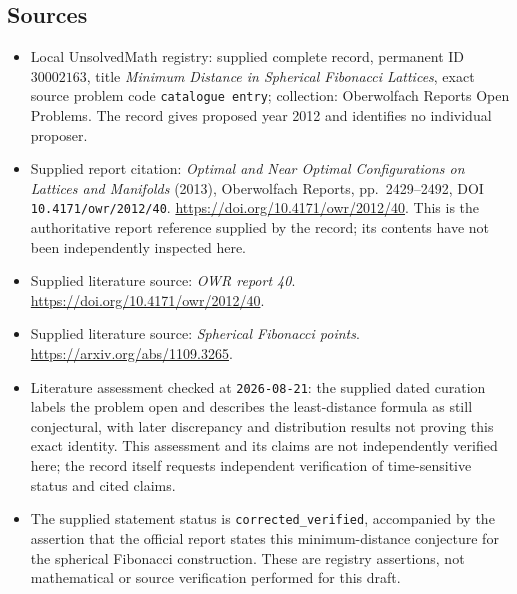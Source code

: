 \documentclass[11pt]{article}
\begin{document}
\subsection{Sources}
\begin{itemize}
\item Local UnsolvedMath registry: supplied complete record, permanent ID \(30002163\), title \emph{Minimum Distance in Spherical Fibonacci Lattices}, exact source problem code \texttt{catalogue entry}; collection: Oberwolfach Reports Open Problems. The record gives proposed year 2012 and identifies no individual proposer.
\item Supplied report citation: \emph{Optimal and Near Optimal Configurations on Lattices and Manifolds} (2013), Oberwolfach Reports, pp.\ 2429--2492, DOI \texttt{10.4171/owr/2012/40}. \url{https://doi.org/10.4171/owr/2012/40}. This is the authoritative report reference supplied by the record; its contents have not been independently inspected here.
\item Supplied literature source: \emph{OWR report 40}. \url{https://doi.org/10.4171/owr/2012/40}.
\item Supplied literature source: \emph{Spherical Fibonacci points}. \url{https://arxiv.org/abs/1109.3265}.
\item Literature assessment checked at \texttt{2026-08-21}: the supplied dated curation labels the problem open and describes the least-distance formula as still conjectural, with later discrepancy and distribution results not proving this exact identity. This assessment and its claims are not independently verified here; the record itself requests independent verification of time-sensitive status and cited claims.
\item The supplied statement status is \texttt{corrected\_verified}, accompanied by the assertion that the official report states this minimum-distance conjecture for the spherical Fibonacci construction. These are registry assertions, not mathematical or source verification performed for this draft.
\end{itemize}
\end{document}
